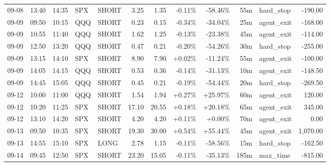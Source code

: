 \documentclass[11pt,a4paper,twoside]{article}
\begin{document}
\begin{center}
\begin{longtable}{>{\color{txtmain}}l l l l l r r r r r >{\color{txtmain}}l r}
09-08 & 13:40 & 14:35 & SPX & SHORT & 3.25 & 1.35 & \textcolor{lossred}{-0.11\%} & \textcolor{lossred}{-58.46\%} & 55m & hard\_stop & \textcolor{lossred}{-190.00} \\
09-09 & 09:50 & 10:15 & QQQ & SHORT & 0.23 & 0.15 & \textcolor{lossred}{-0.34\%} & \textcolor{lossred}{-34.04\%} & 25m & agent\_exit & \textcolor{lossred}{-168.00} \\
09-09 & 10:55 & 11:40 & QQQ & SHORT & 1.62 & 1.25 & \textcolor{lossred}{-0.13\%} & \textcolor{lossred}{-23.38\%} & 45m & agent\_exit & \textcolor{lossred}{-114.00} \\
09-09 & 12:50 & 13:20 & QQQ & SHORT & 0.47 & 0.21 & \textcolor{lossred}{-0.20\%} & \textcolor{lossred}{-54.26\%} & 30m & hard\_stop & \textcolor{lossred}{-255.00} \\
09-09 & 13:15 & 14:10 & SPX & SHORT & 8.90 & 7.90 & \textcolor{wingreen}{+0.02\%} & \textcolor{lossred}{-11.24\%} & 55m & agent\_exit & \textcolor{lossred}{-100.00} \\
09-09 & 14:05 & 14:15 & QQQ & SHORT & 0.53 & 0.36 & \textcolor{lossred}{-0.14\%} & \textcolor{lossred}{-31.13\%} & 10m & agent\_exit & \textcolor{lossred}{-148.50} \\
09-09 & 14:45 & 15:05 & QQQ & SHORT & 0.45 & 0.21 & \textcolor{lossred}{-0.19\%} & \textcolor{lossred}{-54.44\%} & 20m & hard\_stop & \textcolor{lossred}{-269.50} \\
09-12 & 10:00 & 11:00 & QQQ & SHORT & 1.54 & 1.94 & \textcolor{wingreen}{+0.27\%} & \textcolor{wingreen}{+25.97\%} & 60m & agent\_exit & \textcolor{wingreen}{120.00} \\
09-12 & 10:20 & 11:25 & SPX & SHORT & 17.10 & 20.55 & \textcolor{wingreen}{+0.18\%} & \textcolor{wingreen}{+20.18\%} & 65m & agent\_exit & \textcolor{wingreen}{345.00} \\
09-12 & 13:10 & 14:20 & SPX & SHORT & 4.20 & 4.20 & \textcolor{wingreen}{+0.11\%} & \textcolor{wingreen}{+0.00\%} & 70m & agent\_exit & \textcolor{wingreen}{0.00} \\
09-13 & 09:50 & 10:35 & SPX & SHORT & 19.30 & 30.00 & \textcolor{wingreen}{+0.54\%} & \textcolor{wingreen}{+55.44\%} & 45m & agent\_exit & \textcolor{wingreen}{1,070.00} \\
09-13 & 14:55 & 15:10 & SPX & LONG & 2.78 & 1.15 & \textcolor{lossred}{-0.11\%} & \textcolor{lossred}{-58.56\%} & 15m & hard\_stop & \textcolor{lossred}{-162.50} \\
09-14 & 09:45 & 12:50 & SPX & SHORT & 23.20 & 15.05 & \textcolor{lossred}{-0.11\%} & \textcolor{lossred}{-35.13\%} & 185m & max\_time & \textcolor{lossred}{-815.00} \\

\end{longtable}
\end{center}
\end{document}

